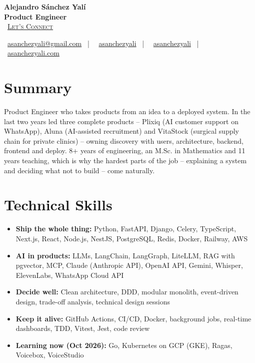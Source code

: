 \documentclass[letterpaper,10pt]{article}
\newcommand{\normalfaCalendar}{{\mdseries\faCalendar}}
\newcommand{\normalfaEnvelope}{{\mdseries\faEnvelope}}
\newcommand{\normalfaLinkedin}{{\mdseries\faLinkedin}}
\newcommand{\normalfaGithub}{{\mdseries\faGithub}}
\newcommand{\normalfaGlobe}{{\mdseries\faGlobe}}
\begin{document}
\begin{center}
\textbf{\LARGE Alejandro S\'anchez Yal\'i}\\[0.2em]
\textbf{\Large Product Engineer}\\[0.4em]
\small
\normalfaCalendar\ \href{https://cal.com/asanchezyali/full-time-opportunities}{\textsc{Let's Connect}}

\vspace{0.5em}
\normalfaEnvelope\ \href{mailto:asanchezyali@gmail.com}{asanchezyali@gmail.com}  ~|~
\normalfaLinkedin\ \href{https://www.linkedin.com/in/asanchezyali}{asanchezyali} ~|~
\normalfaGithub\ \href{https://github.com/asanchezyali}{asanchezyali}  ~|~
\normalfaGlobe\ \href{https://asanchezyali.com}{asanchezyali.com}
\end{center}


\section{Summary}
Product Engineer who takes products from an idea to a deployed system. In the last two years led three complete products -- Plixiq (AI customer support on WhatsApp), Aluna (AI-assisted recruitment) and VitaStock (surgical supply chain for private clinics) -- owning discovery with users, architecture, backend, frontend and deploy. 8+ years of engineering, an M.Sc. in Mathematics and 11 years teaching, which is why the hardest parts of the job -- explaining a system and deciding what not to build -- come naturally.

\section{Technical Skills}
\begin{itemize}[leftmargin=*, itemsep=0pt]
  \item \textbf{Ship the whole thing:} Python, FastAPI, Django, Celery, TypeScript, Next.js, React, Node.js, NestJS, PostgreSQL, Redis, Docker, Railway, AWS
  \item \textbf{AI in products:} LLMs, LangChain, LangGraph, LiteLLM, RAG with pgvector, MCP, Claude (Anthropic API), OpenAI API, Gemini, Whisper, ElevenLabs, WhatsApp Cloud API
  \item \textbf{Decide well:} Clean architecture, DDD, modular monolith, event-driven design, trade-off analysis, technical design sessions
  \item \textbf{Keep it alive:} GitHub Actions, CI/CD, Docker, background jobs, real-time dashboards, TDD, Vitest, Jest, code review
  \item \textbf{Learning now (Oct 2026):} Go, Kubernetes on GCP (GKE), Ragas, Voicebox, VoiceStudio
\end{itemize}
\end{document}
